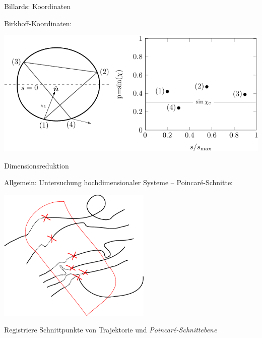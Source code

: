 \begin{frame}{Billards: Koordinaten}

  Birkhoff-Koordinaten:

  \begin{center}
    \includegraphics[width=0.95\linewidth]{Figures/Billiard-crop.pdf}
  \end{center}
\end{frame}


\begin{frame}{Dimensionsreduktion}

  Allgemein: Untersuchung hochdimensionaler Systeme -- Poincar\'e-Schnitte:

  \begin{center}
    \includegraphics[width=0.55\textwidth]{Figures/PSOS.pdf}
  \end{center}

  Registriere Schnittpunkte von Trajektorie und \emph{Poincar\'e-Schnittebene}
\end{frame}


